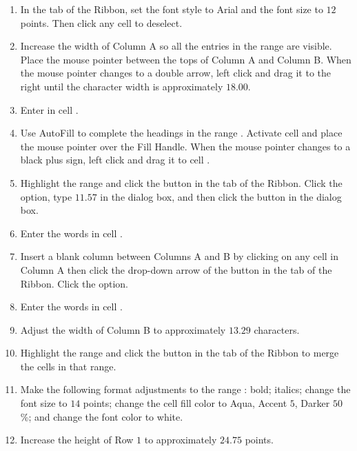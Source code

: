 \begin{enumerate}[resume]
	\item In the  tab of the Ribbon, set the font style to Arial and the font size to $ 12 $ points. Then click any cell to deselect.
	\item Increase the width of Column A so all the entries in the range  are visible. Place the mouse pointer between the tops of Column A and Column B. When the mouse pointer changes to a double arrow, left click and drag it to the right until the character width is approximately $ 18.00 $.
	\item Enter  in cell .
	\item Use AutoFill to complete the headings in the range . Activate cell  and place the mouse pointer over the Fill Handle. When the mouse pointer changes to a black plus sign, left click and drag it to cell .
	\item Highlight the range  and click the  button in the  tab of the Ribbon. Click the  option, type $ 11.57 $ in the  dialog box, and then click the  button in the  dialog box.
	\item Enter the words  in cell .
	\item Insert a blank column between Columns A and B by clicking on any cell in Column A then click the drop-down arrow of the  button in the  tab of the Ribbon. Click the  option.
	\item Enter the words  in cell .
	\item Adjust the width of Column B to approximately $ 13.29 $ characters.
	\item Highlight the range  and click the  button in the  tab of the Ribbon to merge the cells in that range.
	\item Make the following format adjustments to the range : bold; italics; change the font size to $ 14 $ points; change the cell fill color to Aqua, Accent $ 5 $, Darker $ 50 $\%; and change the font color to white.
	\item Increase the height of Row $ 1 $ to approximately $ 24.75 $ points.

\end{enumerate}
